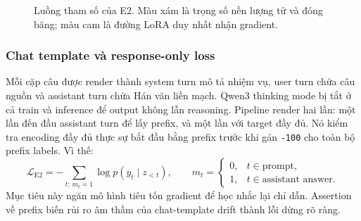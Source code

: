 \begin{figure}[tbp]
  \centering
  \caption{Luồng tham số của E2. Màu xám là trọng số nền lượng tử và đóng
  băng; màu cam là đường LoRA duy nhất nhận gradient.}
  \label{fig:qlora-path}
\end{figure}

\subsubsection{Chat template và response-only loss}

Mỗi cặp câu được render thành system turn mô tả nhiệm vụ, user turn chứa câu
nguồn và assistant turn chứa Hán văn liền mạch. Qwen3 thinking mode bị tắt ở
cả train và inference để output không lẫn reasoning. Pipeline render hai lần:
một lần đến đầu assistant turn để lấy prefix, và một lần với target đầy đủ.
Nó kiểm tra encoding đầy đủ thực sự bắt đầu bằng prefix trước khi gán
\texttt{-100} cho toàn bộ prefix labels. Vì thế:
\begin{equation}
  \mathcal{L}_{\mathrm{E2}}
  = -\sum_{t:\,m_t=1}\log p(y_t\mid z_{<t}),\qquad
  m_t = \begin{cases}0,&t\in\text{prompt},\\1,&t\in\text{assistant answer}.
  \end{cases}
  \label{eq:response-loss}
\end{equation}
Mục tiêu này ngăn mô hình tiêu tốn gradient để học nhắc lại chỉ dẫn. Assertion
về prefix biến rủi ro âm thầm của chat-template drift thành lỗi dừng rõ ràng.

